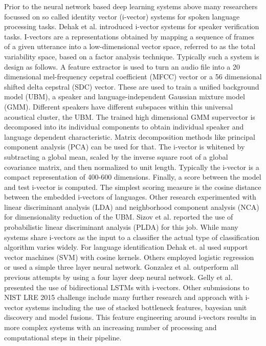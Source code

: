 Prior to the neural network based deep learning systems above many researchers focussed on so called identity vector (i-vector) systems for spoken language processing tasks. Dehak et al.\cite{dehak2011front} introduced i-vector systems for speaker verification tasks. I-vectors are a representations obtained by mapping a sequence of frames of a given utterance into a low-dimensional vector space, referred to as the total 	variability space, based on a factor analysis technique. Typically such a system is design as follows. A feature extractor is used to turn an audio file into a 20 dimensional mel-frequency cepstral coefficient (MFCC) vector or a 56 dimensional shifted delta cepstral (SDC) vector. These are used to train a unified background model (UBM), a speaker and language-independent Gaussian mixture model (GMM). Different speakers have different subspaces within this universal acoustical cluster, the UBM. The trained high dimensional GMM supervector is decomposed into its individual components to obtain individual speaker and language dependent characteristic. Matrix decomposition methods like principal component analysis (PCA) can be used for that. The i-vector is whitened by subtracting a global mean, scaled by the inverse square root of a global covariance matrix, and then normalized to unit length\cite{garcia2011analysis}. Typically the i-vector is a compact representation of 400-600 dimensions. Finally, a score between the model and test i-vector is computed. The simplest scoring measure is the cosine distance between the embedded i-vectors of languages. 
Other research\cite{dehak2011front} experimented with linear discriminant analysis (LDA) and neighborhood component analysis (NCA) for dimensionality reduction of the UBM. Sizov et al. reported the use of probabilistic linear discriminant analysis (PLDA) for this job.\cite{sizov2016discriminating}
While many systems share i-vectors as the input to a classifier the actual type of classification algorithm varies widely. For language identification Dehak et. al\cite{dehak2011front} used support vector machines (SVM) with cosine kernels. Others\cite{martinez2011language} employed logistic regression or used a simple three layer neural network\cite{plchot2016bat}. Gonzalez et al.\cite{gonzalez2015frame} outperform all previous attempts by using a four layer deep neural network. Gelly et al.\cite{gelly2016language} presented the use of bidirectional LSTMs with i-vectors. Other submissions\cite{lee20162015, torres2008mitll, ng2016sheffield} to NIST LRE 2015 challenge\cite{lre2015} include many further research and approach with i-vector systems including the use of stacked bottleneck features, bayesian unit discovery and model fusions. This feature engineering around i-vectors results in more complex systems with an increasing number of processing and computational steps in their pipeline.




       